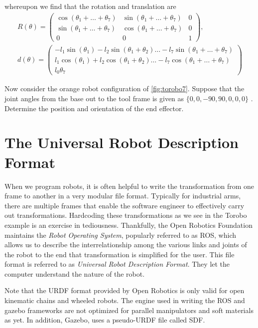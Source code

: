 %
whereupon we find that the rotation and translation are 
%
\begin{align}
	R(\theta) = \left(\begin{array}{ccc}
	\cos(\theta_1+\ldots + \theta_7) & \sin(\theta_1+\ldots + \theta_7) &0 \\
	\sin(\theta_1+\ldots + \theta_7) & \cos(\theta_1+\ldots + \theta_7) &0 \\
	0 & 0 & 1
	\end{array}\right), 
	\nonumber \\
	d(\theta) = \left(\begin{array}{c}
	-l_1 \sin(\theta_1) - l_2 \sin(\theta_1+ \theta_2) \ldots - l_7\sin(\theta_1+  \ldots + \theta_7) \\
	l_1 \cos(\theta_1) + l_2 \cos(\theta_1+ \theta_2) \ldots - l_7\cos(\theta_1 + \ldots + \theta_7) \\
	l_0  \theta_7
	\end{array}\right) 
\end{align}

\begin{homework}
	Now consider the orange robot configuration of \autoref{fig:torobo7}. Suppose that the joint angles from the base out to the tool frame is given as $\{0, 0, -90, 90, 0, 0, 0\}$ . Determine the position and orientation of the end effector. 
\end{homework}

\section{The Universal Robot Description Format}
%
When we program robots, it is often helpful to write the transformation from one frame to another in a very modular file format. Typically for industrial arms, there are multiple frames that enable the software engineer to effectively carry out transformations. Hardcoding these transformations as we see in the Torobo example is an exercise in tediousness. Thankfully, the Open Robotics Foundation maintains the \textit{Robot Operating System}, popularly referred to as ROS, which allows us to describe the interrelationship among the various links and joints of the robot to the end that transformation is simplified for the user. This file format is referred to as \textit{Universal Robot Description Format}. They let the computer understand the nature of the robot. 

Note that the URDF format provided by Open Robotics is only valid for open kinematic chains and wheeled robots. The engine used in writing the ROS and gazebo frameworks are not optimized for parallel manipulators and soft materials as yet. In addition, Gazebo, uses a pseudo-URDF file called \textsc{SDF}. 


